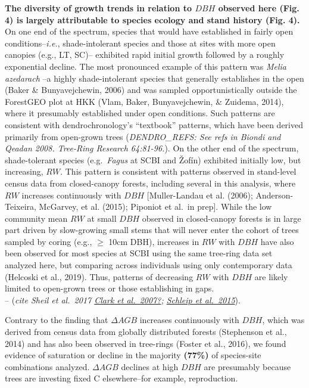 \documentclass[
]{article}
\begin{document}
\textbf{The diversity of growth trends in relation to \(DBH\) observed
here (Fig. 4) is largely attributable to species ecology and stand
history (Fig. 4).} On one end of the spectrum, species that would have
established in fairly open conditions--\emph{i.e.}, shade-intolerant
species and those at sites with more open canopies (e.g., LT, SC)--
exhibited rapid initial growth followed by a roughly exponential
decline. The most pronounced example of this pattern was \emph{Melia
azedarach} --a highly shade-intolerant species that generally
establishes in the open (Baker \& Bunyavejchewin, 2006) and was sampled
opportunistically outside the ForestGEO plot at HKK (Vlam, Baker,
Bunyavejchewin, \& Zuidema, 2014), where it presumably established under
open conditions. Such patterns are consistent with dendrochronology's
``textbook'' patterns, which have been derived primarily from open-grown
trees (\emph{DENDRO\_REFS: See refs in Biondi and Qeadan 2008. Tree-Ring
Research 64:81-96.}). On the other end of the spectrum, shade-tolerant
species (e.g.~\emph{Fagus} at SCBI and Žofín) exhibited initially low,
but increasing, \(RW\). This pattern is consistent with patterns
observed in stand-level census data from closed-canopy forests,
including several in this analysis, where \(RW\) increases continuously
with \(DBH\) {[}Muller-Landau et al. (2006); Anderson-Teixeira,
McGarvey, et al. (2015); Piponiot et al.~in prep{]}. While the low
community mean \(RW\) at small \(DBH\) observed in closed-canopy forests
is in large part driven by slow-growing small stems that will never
enter the cohort of trees sampled by coring (e.g., \(\ge\) 10cm DBH),
increases in \(RW\) with \(DBH\) have also been observed for most
species at SCBI using the same tree-ring data set analyzed here, but
comparing across individuals using only contemporary data (Helcoski et
al., 2019). Thus, patterns of decreasing \(RW\) with \(DBH\) are likely
limited to open-grown trees or those establishing in gaps.\\
-- (\emph{cite Sheil et al.~2017
\href{https://esajournals-onlinelibrary-wiley-com.smithsonian.idm.oclc.org/doi/epdf/10.1890/06-1039.1}{Clark
et al.~2007?};
\href{https://onlinelibrary-wiley-com.smithsonian.idm.oclc.org/doi/abs/10.1002/env.2324}{Schleip
et al.~2015}}).

Contrary to the finding that \(\Delta AGB\) increases continuously with
\(DBH\), which was derived from census data from globally distributed
forests (Stephenson et al., 2014) and has also been observed in
tree-rings (Foster et al., 2016), we found evidence of saturation or
decline in the majority \textbf{(77\%)} of species-site combinations
analyzed. \(\Delta AGB\) declines at high \(DBH\) are presumably because
trees are investing fixed C elsewhere--for example, reproduction.
\end{document}
